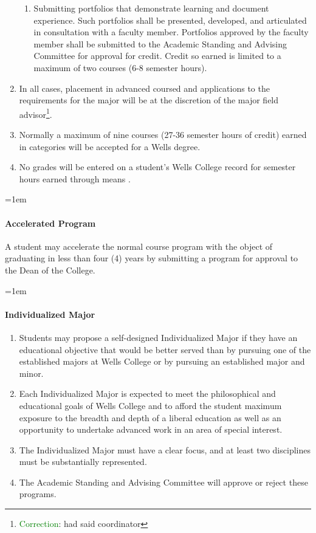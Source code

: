 \documentclass{manual}
\newcommand{\modified}[1]{}
\let\oldparagraph\paragraph
\renewcommand\paragraph{\leftskip=1em\oldparagraph}
\newcommand{\editRemark}[3]{\textcolor{green}{#2}\footnote{\textcolor{green}{#1}: #3}}
\newcommand{\itemLevelA}{\alph*.}
\newcommand{\itemLevelB}{\arabic*)}
\newcommand{\itemRefA}{\alph*}
\newcommand{\itemRefB}{\arabic*}
\begin{document}
\begin{enumerate}[label=\itemLevelA,ref=\itemRefA]
\begin{enumerate}[label=\itemLevelB,ref=\itemRefB]
\item \label{iitem:portfolio} Submitting portfolios that demonstrate learning and document experience. Such portfolios shall be presented, developed, and articulated in consultation with a faculty member. Portfolios approved by the faculty member shall be submitted to the Academic Standing and Advising Committee for approval for credit. Credit so earned is limited to a maximum of two courses (6-8 semester hours).
\end{enumerate}

\item In all cases, placement in advanced coursed and applications to the requirements for the major will be at the discretion of the major field advisor\editRemark{Correction}{}{had said coordinator}.
\item Normally a maximum of nine courses (27-36 semester hours of credit) earned in categories  will be accepted for a Wells degree.
\item No grades will be entered on a student's Wells College record for semester hours earned through means .
\end{enumerate}

\paragraph{Accelerated Program}
A student may accelerate the normal course program with the object of graduating in less than four (4) years by submitting a program for approval to the Dean of the College.

\paragraph{Individualized Major}

\begin{enumerate}[label=\itemLevelA,ref=\itemRefA]
\item  Students may propose a self-designed Individualized Major if they have an educational objective \modified{11/10/2009} that would be better served than by pursuing one of the established majors at Wells College or by pursuing an established major and minor.  
\item Each Individualized Major is expected to meet the philosophical and educational goals of Wells College and to afford the student maximum exposure to the breadth and depth of a liberal education as well as an opportunity to undertake advanced work in an area of special interest.  
\item The Individualized Major must have a clear focus, and at least two disciplines must be substantially represented. 
\item The Academic Standing and Advising Committee will approve or reject these programs.
\end{enumerate}
\end{document}
